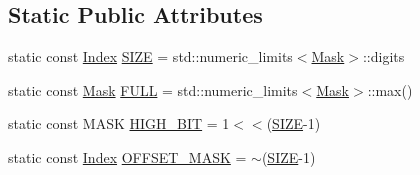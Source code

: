 \subsection*{Static Public Attributes}
\begin{DoxyCompactItemize}
\item 
static const \hyperlink{structutil_1_1MemChunk_a4f05352eb1c778a4791abe24d912b837}{Index} \hyperlink{structutil_1_1MemChunk_af23d23ae810e7d52f138dd5a37a897ff}{S\-I\-Z\-E} = std\-::numeric\-\_\-limits$<$\hyperlink{structutil_1_1MemChunk_a4ebe426d4977c2a9d95307cca65e3874}{Mask}$>$\-::digits
\item 
static const \hyperlink{structutil_1_1MemChunk_a4ebe426d4977c2a9d95307cca65e3874}{Mask} \hyperlink{structutil_1_1MemChunk_a7d4625b286d5ade5d6b07d7f2db1065f}{F\-U\-L\-L} = std\-::numeric\-\_\-limits$<$\hyperlink{structutil_1_1MemChunk_a4ebe426d4977c2a9d95307cca65e3874}{Mask}$>$\-::max()
\item 
static const M\-A\-S\-K \hyperlink{structutil_1_1MemChunk_a17e94adf5f378b536687c8782dee4f71}{H\-I\-G\-H\-\_\-\-B\-I\-T} = 1$<$$<$(\hyperlink{structutil_1_1MemChunk_af23d23ae810e7d52f138dd5a37a897ff}{S\-I\-Z\-E}-\/1)
\item 
static const \hyperlink{structutil_1_1MemChunk_a4f05352eb1c778a4791abe24d912b837}{Index} \hyperlink{structutil_1_1MemChunk_a368c2094ff243b97cb21dc0bf684e653}{O\-F\-F\-S\-E\-T\-\_\-\-M\-A\-S\-K} = $\sim$(\hyperlink{structutil_1_1MemChunk_af23d23ae810e7d52f138dd5a37a897ff}{S\-I\-Z\-E}-\/1)
\end{DoxyCompactItemize}


